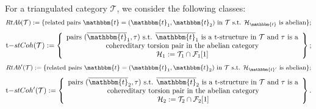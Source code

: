 \begin{definition}
  For a triangulated category $\mathcal{T}$, we consider the following classes:
  \[RtAb(\mathcal{T}):=\{\text{related pairs }\mathbbm{t}=(\mathbbm{t}_1,\mathbbm{t}_2)
  \text{ in }\mathcal{T}\text{ s.t. }\mathcal{H}_\mathbbm{t}\text{ is abelian}\};\]
      \begin{equation*}
        \mathrm{t-}stCoh(\mathcal{T}) :=
        \left\{
        \begin{array}{c}
          \text{pairs }(\overline{\mathbbm{t}}_1,\tau)\text{ s.t. }
          \overline{\mathbbm{t}}_1\text{ is a t-structure in }\mathcal{T}\text{ and }
          \tau\text{ is a}\\
          \text{ cohereditary torsion pair in the abelian category } \\
          \mathcal{H}_1:=\T_1\cap\F_1[1]
        \end{array}
        \right\};
      \end{equation*}
      \[RtAb^\prime(\mathcal{T}):=\{\text{related pairs }\mathbbm{t}=(\mathbbm{t}_1,\mathbbm{t}_2)
      \text{ in }\mathcal{T}\text{ s.t. }\mathcal{H}_{\mathbbm{t}'}\text{ is abelian}\};\]
      \begin{equation*}
        \mathrm{t-}stCoh^\prime(\mathcal{T}) :=
        \left\{
        \begin{array}{c}
          \text{pairs }(\overline{\mathbbm{t}}_2,\tau)\text{ s.t. }
          \overline{\mathbbm{t}}_2\text{ is a t-structure in }\mathcal{T}\text{ and }
          \tau\text{ is a}\\
          \text{ cohereditary torsion pair in the abelian category } \\
          \mathcal{H}_2:=\T_2\cap\F_2[1]
        \end{array}
        \right\}.
      \end{equation*}
\end{definition}

